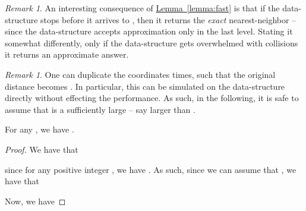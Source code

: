 \documentclass[12pt]{article}\usepackage[cm]{fullpage}
\theoremstyle{remark}\theoremheaderfont{\sf}\theorembodyfont{\upshape}\newtheorem{defn}[theorem]{Definition}
\newtheorem{remark}[theorem]{Remark}\newtheorem{example}[theorem]{Example}\newtheorem*{remark:unnumbered}[theorem]{Remark}
\numberwithin{figure}{section}\numberwithin{table}{section}\numberwithin{equation}{section}
\newcommand{\HLink}[2]{\hyperref[#2]{#1~\ref*{#2}}}
\newcommand{\lemlab}[1]{\label{lemma:#1}}
\newcommand{\lemref}[1]{\HLink{Lemma}{lemma:#1}}
\newcommand{\remlab}[1]{\label{rem:#1}}
\begin{document}
\begin{remark}
    An interesting consequence of \lemref{fast} is that if the
    data-structure stops before it arrives to , then it
    returns the \emph{exact} nearest-neighbor -- since the
    data-structure accepts approximation only in the last
    level. Stating it somewhat differently, only if the data-structure
    gets overwhelmed with collisions it returns an approximate answer.
\end{remark}


\begin{remark}
    \remlab{m:large}One can duplicate the coordinates  times, such that the
    original distance  becomes .  In particular, this can
    be simulated on the data-structure directly without effecting the
    performance. As such, in the following, it is safe to assume that
     is a sufficiently large -- say larger than .
\end{remark}

\begin{lemma}
    \lemlab{N:i}For any , we have .
\end{lemma}
\begin{proof}
    We have that
    
    since for any positive integer , we have
    .  As such, since we can
    assume that , we have that
    
    Now, we have
    
\end{proof}
\end{document}
